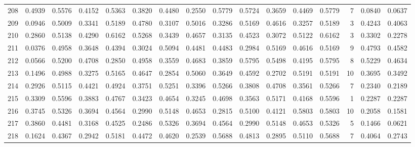 \begin{tabular}{lrrrrrrrrrrrrrrr}
208 &      0.4939 &  0.5576 &  0.4152 &  0.5363 &  0.3820 &  0.4480 &  0.2550 &  0.5779 &  0.5724 &  0.3659 &   0.4469 &     0.5779 &      7 &                    0.0840 &                     0.0637 \\
209 &      0.0946 &  0.5009 &  0.3341 &  0.5189 &  0.4780 &  0.3107 &  0.5016 &  0.3286 &  0.5169 &  0.4616 &   0.3257 &     0.5189 &      3 &                    0.4243 &                     0.4063 \\
210 &      0.2860 &  0.5138 &  0.4290 &  0.6162 &  0.5268 &  0.3439 &  0.4657 &  0.3135 &  0.4523 &  0.3072 &   0.5122 &     0.6162 &      3 &                    0.3302 &                     0.2278 \\
211 &      0.0376 &  0.4958 &  0.3648 &  0.4394 &  0.3024 &  0.5094 &  0.4481 &  0.4483 &  0.2984 &  0.5169 &   0.4616 &     0.5169 &      9 &                    0.4793 &                     0.4582 \\
212 &      0.0566 &  0.5200 &  0.4708 &  0.2850 &  0.4958 &  0.3559 &  0.4683 &  0.3859 &  0.5795 &  0.5498 &   0.4195 &     0.5795 &      8 &                    0.5229 &                     0.4634 \\
213 &      0.1496 &  0.4988 &  0.3275 &  0.5165 &  0.4647 &  0.2854 &  0.5060 &  0.3649 &  0.4592 &  0.2702 &   0.5191 &     0.5191 &     10 &                    0.3695 &                     0.3492 \\
214 &      0.2926 &  0.5115 &  0.4421 &  0.4924 &  0.3751 &  0.5251 &  0.3396 &  0.5266 &  0.3808 &  0.4708 &   0.3561 &     0.5266 &      7 &                    0.2340 &                     0.2189 \\
215 &      0.3309 &  0.5596 &  0.3883 &  0.4767 &  0.3423 &  0.4654 &  0.3245 &  0.4698 &  0.3563 &  0.5171 &   0.4168 &     0.5596 &      1 &                    0.2287 &                     0.2287 \\
216 &      0.3745 &  0.5326 &  0.3694 &  0.4564 &  0.2990 &  0.5148 &  0.4653 &  0.2815 &  0.5100 &  0.4121 &   0.5803 &     0.5803 &     10 &                    0.2058 &                     0.1581 \\
217 &      0.3860 &  0.4481 &  0.3168 &  0.4525 &  0.2486 &  0.5326 &  0.3694 &  0.4564 &  0.2990 &  0.5148 &   0.4653 &     0.5326 &      5 &                    0.1466 &                     0.0621 \\
218 &      0.1624 &  0.4367 &  0.2942 &  0.5181 &  0.4472 &  0.4620 &  0.2539 &  0.5688 &  0.4813 &  0.2895 &   0.5110 &     0.5688 &      7 &                    0.4064 &                     0.2743 \\

\end{tabular}
